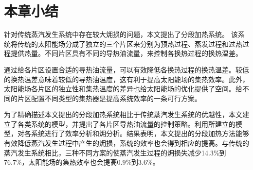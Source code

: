 \section{本章小结}

针对传统蒸汽发生系统中存在较大㶲损的问题，本文提出了分段加热系统。
该系统将传统的太阳能场分成了独立的三个片区来分别为预热过程、蒸发过程和过热过程提供热量。不同片区具有不同的导热油流量，来控制各换热过程的换热温差。

通过给各片区设置合适的导热油流量，可以有效降低各换热过程的换热温差。较低的换热温差意味着较低的导热油温度，这有利于提高太阳能场的集热效率。此外，太阳能场各片区的独立性和集热温度的差异也给太阳能场的优化提供了空间。给不同的片区配置不同类型的集热器是提高系统效率的一条可行方案。

为了精确描述本文提出的分段加热系统相比于传统蒸汽发生系统的优越性，本文建立了各类系统的模型，并提出了各片区导热油流量的控制策略。利用所建立的模型，对各系统进行了效率分析和㶲分析。结果表明，本文提出的分段加热方法能够有效降低蒸汽发生过程中产生的㶲损，系统的效率也会得到相应的提高。与传统的蒸汽发生系统相比，三种不同方案的使蒸汽发生过程的㶲损失减少14.3\%到76.7\%，太阳能场的集热效率也会提高0.9\%到3.6\%。